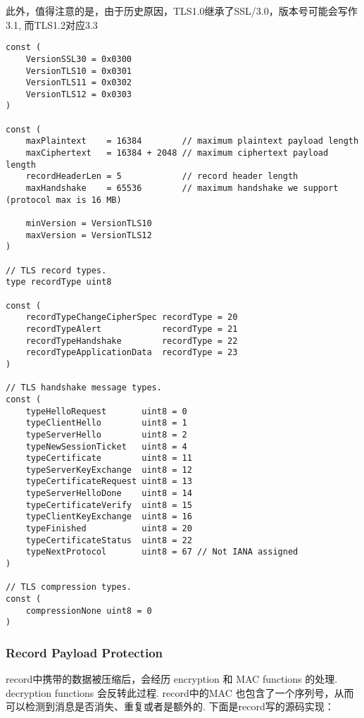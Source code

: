 \documentclass[a4paper]{ctexart}
\begin{document}
此外，值得注意的是，由于历史原因，TLS1.0继承了SSL/3.0，版本号可能会写作3.1, 而TLS1.2对应3.3

\begin{lstlisting}[frame=single, stepnumber=5, firstnumber=1, caption={TLS协议中的TLS record 类型以及handshake 消息类型}]
const (
	VersionSSL30 = 0x0300
	VersionTLS10 = 0x0301
	VersionTLS11 = 0x0302
	VersionTLS12 = 0x0303
)

const (
	maxPlaintext    = 16384        // maximum plaintext payload length
	maxCiphertext   = 16384 + 2048 // maximum ciphertext payload length
	recordHeaderLen = 5            // record header length
	maxHandshake    = 65536        // maximum handshake we support (protocol max is 16 MB)

	minVersion = VersionTLS10
	maxVersion = VersionTLS12
)

// TLS record types.
type recordType uint8

const (
	recordTypeChangeCipherSpec recordType = 20
	recordTypeAlert            recordType = 21
	recordTypeHandshake        recordType = 22
	recordTypeApplicationData  recordType = 23
)

// TLS handshake message types.
const (
	typeHelloRequest       uint8 = 0
	typeClientHello        uint8 = 1
	typeServerHello        uint8 = 2
	typeNewSessionTicket   uint8 = 4
	typeCertificate        uint8 = 11
	typeServerKeyExchange  uint8 = 12
	typeCertificateRequest uint8 = 13
	typeServerHelloDone    uint8 = 14
	typeCertificateVerify  uint8 = 15
	typeClientKeyExchange  uint8 = 16
	typeFinished           uint8 = 20
	typeCertificateStatus  uint8 = 22
	typeNextProtocol       uint8 = 67 // Not IANA assigned
)

// TLS compression types.
const (
	compressionNone uint8 = 0
)
\end{lstlisting}

\subsubsection{Record Payload Protection}
record中携带的数据被压缩后，会经历 encryption 和 MAC functions 的处理. decryption functions 会反转此过程.
record中的MAC 也包含了一个序列号，从而可以检测到消息是否消失、重复或者是额外的.
下面是record写的源码实现：
\end{document}
